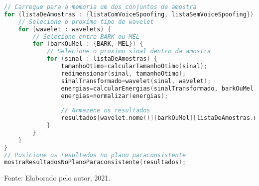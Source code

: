 \begin{lstlisting}[language=C++, caption={Algoritmo que caracteriza o procedimento 01}, captionpos=t, label={lst:experiment01Algo}, belowskip=-4 \baselineskip]
// Carregue para a memoria um dos conjuntos de amostra
for (listaDeAmostras : {listaComVoiceSpoofing, listaSemVoiceSpoofing}) {
	// Selecione o proximo tipo de wavelet
	for (wavelet : wavelets) {
		// Selecione entre BARK ou MEL
		for (barkOuMel : {BARK, MEL}) {
			// Selecione o proximo sinal dentro da amostra
			for (sinal : listaDeAmostras) {
				tamanhoOtimo=calcularTamanhoOtimo(sinal);
				redimensionar(sinal, tamanhoOtimo);
				sinalTransformado=wavelet(sinal, wavelet);
				energias=calcularEnergias(sinalTransformado, barkOuMel);
				energias=normalizar(energias);
				
				// Armazene os resultados
				resultados[wavelet.nome()][barkOuMel][listaDeAmostras.nome()].adicionar(energias);
			}
		}
	}
}
// Posicione os resultados no plano paraconsistente
mostraResultadosNoPlanoParaconsistente(resultados);
\end{lstlisting}
\begin{center}
	\par Fonte: Elaborado pelo autor, 2021.\\
\end{center}